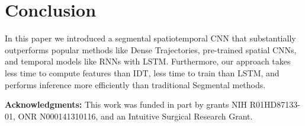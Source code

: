 \documentclass[runningheads]{llncs}
\newcommand{\fakesubsection}[1]{\smallskip\noindent\textbf{#1:}}
\begin{document}
 \section{Conclusion}
\label{sec:conclusion}
In this paper we introduced a segmental spatiotemporal CNN that substantially outperforms popular methods like Dense Trajectories, pre-trained spatial CNNs, and temporal models like RNNs with LSTM. 
Furthermore, our approach takes less time to compute features than IDT, less time to train than LSTM, and performs inference more efficiently than traditional Segmental methods.


\fakesubsection{Acknowledgments} This work was funded in part by grants NIH R01HD87133-01,
ONR N000141310116, and an Intuitive Surgical Research Grant.
 
\clearpage





\end{document}
